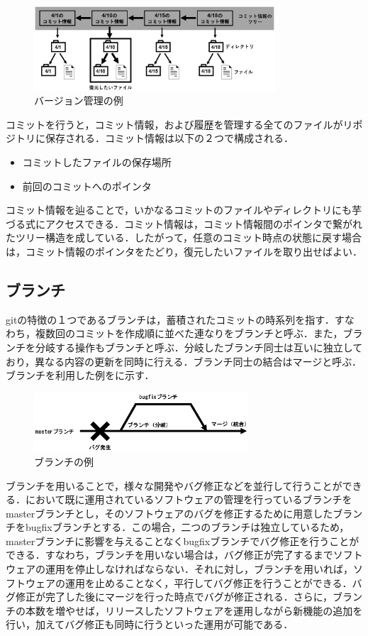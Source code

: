 \documentclass[a4j,9pt,twocolumn]{jsarticle}
\begin{document}
\begin{figure}[h]
\centering
\includegraphics[width=90mm]{img/tree.eps}
\caption{バージョン管理の例}
\label{tree}
\end{figure}

コミットを行うと，コミット情報，および履歴を管理する全てのファイルがリポジトリに保存される．コミット情報は以下の２つで構成される．

\begin{itemize}
\item コミットしたファイルの保存場所
\item 前回のコミットへのポインタ
\end{itemize}

コミット情報を辿ることで，いかなるコミットのファイルやディレクトリにも芋づる式にアクセスできる．コミット情報は，コミット情報間のポインタで繋がれたツリー構造を成している．したがって，任意のコミット時点の状態に戻す場合は，コミット情報のポインタをたどり，復元したいファイルを取り出せばよい．

\subsection{ブランチ}
gitの特徴の１つであるブランチは，蓄積されたコミットの時系列を指す．すなわち，複数回のコミットを作成順に並べた連なりをブランチと呼ぶ．また，ブランチを分岐する操作もブランチと呼ぶ．分岐したブランチ同士は互いに独立しており，異なる内容の更新を同時に行える．ブランチ同士の結合はマージと呼ぶ．ブランチを利用した例をに示す．

\begin{figure}[h]
\centering
\includegraphics[width=80mm]{img/branch.eps}
\caption{ブランチの例}
\label{branch_ex}
\end{figure}

ブランチを用いることで，様々な開発やバグ修正などを並行して行うことができる．において既に運用されているソフトウェアの管理を行っているブランチをmasterブランチとし，そのソフトウェアのバグを修正するために用意したブランチをbugfixブランチとする．この場合，二つのブランチは独立しているため，masterブランチに影響を与えることなくbugfixブランチでバグ修正を行うことができる．すなわち，ブランチを用いない場合は，バグ修正が完了するまでソフトウェアの運用を停止しなければならない．それに対し，ブランチを用いれば，ソフトウェアの運用を止めることなく，平行してバグ修正を行うことができる．バグ修正が完了した後にマージを行った時点でバグが修正される．さらに，ブランチの本数を増やせば，リリースしたソフトウェアを運用しながら新機能の追加を行い，加えてバグ修正も同時に行うといった運用が可能である．
\end{document}
